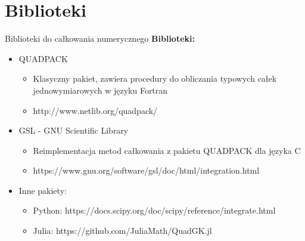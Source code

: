  \section{Biblioteki}
 
  \begin{frame}{Biblioteki do całkowania numerycznego}
      \textbf{Biblioteki:}
      
      \begin{itemize}
     	 \item QUADPACK
          	\begin{itemize}
          		\item Klasyczny pakiet, zawiera procedury do obliczania typowych całek jednowymiarowych w języku Fortran 
          		\item http://www.netlib.org/quadpack/
         \end{itemize}
         \item GSL - GNU Scientific Library
          	\begin{itemize}
          	\item Reimplementacja metod całkowania z pakietu QUADPACK dla języka C
          	\item https://www.gnu.org/software/gsl/doc/html/integration.html
          	\end{itemize}	
         \item Inne pakiety:
         \begin{itemize}
          	\item Python:
            https://docs.scipy.org/doc/scipy/reference/integrate.html
            
          	\item Julia: https://github.com/JuliaMath/QuadGK.jl
          	\end{itemize}	 	
      \end{itemize}
  \end{frame}



























